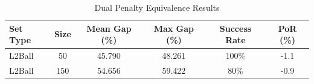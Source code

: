 \begin{table}[htbp]
\centering
\caption{Dual Penalty Equivalence Results}
\label{tab:dual_equivalence}
\begin{tabular}{lccccc}
\toprule
\textbf{Set Type} & \textbf{Size} & \textbf{Mean Gap (\%)} & \textbf{Max Gap (\%)} & \textbf{Success Rate} & \textbf{PoR (\%)} \\
\midrule
L2Ball & 50 & 45.790 & 48.261 & 100\% & -1.1 \\
L2Ball & 150 & 54.656 & 59.422 & 80\% & -0.9 \\
\bottomrule
\end{tabular}
\end{table}
